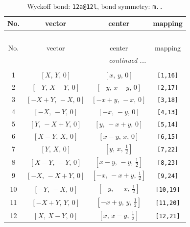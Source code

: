 \documentclass[fleqn,8pt]{jsarticle}
\begin{document}
\begin{longtable}{cccc}
\caption{Wyckoff bond: {\tt 12a@12l}, bond symmetry: {\tt m..}}
 \\
 \hline \hline
No. & vector & center & mapping \\ \hline \endfirsthead

\multicolumn{3}{l}{\tablename\ \thetable{}} \\
 \hline \hline
No. & vector & center & mapping \\ \hline \endhead

 \hline \hline
\multicolumn{3}{r}{\footnotesize\it continued ...} \\ \endfoot

 \hline \hline
\multicolumn{3}{r}{} \\ \endlastfoot

1 & $\left[ X,\, Y,\, 0 \right]$ & $\left[ x,\, y,\, 0 \right]$ & {\tt [1,16]} \\ \hline
2 & $\left[ - Y,\, X - Y,\, 0 \right]$ & $\left[ - y,\, x - y,\, 0 \right]$ & {\tt [2,17]} \\ \hline
3 & $\left[ - X + Y,\, - X,\, 0 \right]$ & $\left[ - x + y,\, - x,\, 0 \right]$ & {\tt [3,18]} \\ \hline
4 & $\left[ - X,\, - Y,\, 0 \right]$ & $\left[ - x,\, - y,\, 0 \right]$ & {\tt [4,13]} \\ \hline
5 & $\left[ Y,\, - X + Y,\, 0 \right]$ & $\left[ y,\, - x + y,\, 0 \right]$ & {\tt [5,14]} \\ \hline
6 & $\left[ X - Y,\, X,\, 0 \right]$ & $\left[ x - y,\, x,\, 0 \right]$ & {\tt [6,15]} \\ \hline
7 & $\left[ Y,\, X,\, 0 \right]$ & $\left[ y,\, x,\, \frac{1}{2} \right]$ & {\tt [7,22]} \\ \hline
8 & $\left[ X - Y,\, - Y,\, 0 \right]$ & $\left[ x - y,\, - y,\, \frac{1}{2} \right]$ & {\tt [8,23]} \\ \hline
9 & $\left[ - X,\, - X + Y,\, 0 \right]$ & $\left[ - x,\, - x + y,\, \frac{1}{2} \right]$ & {\tt [9,24]} \\ \hline
10 & $\left[ - Y,\, - X,\, 0 \right]$ & $\left[ - y,\, - x,\, \frac{1}{2} \right]$ & {\tt [10,19]} \\ \hline
11 & $\left[ - X + Y,\, Y,\, 0 \right]$ & $\left[ - x + y,\, y,\, \frac{1}{2} \right]$ & {\tt [11,20]} \\ \hline
12 & $\left[ X,\, X - Y,\, 0 \right]$ & $\left[ x,\, x - y,\, \frac{1}{2} \right]$ & {\tt [12,21]} \\
\end{longtable}
\end{document}
